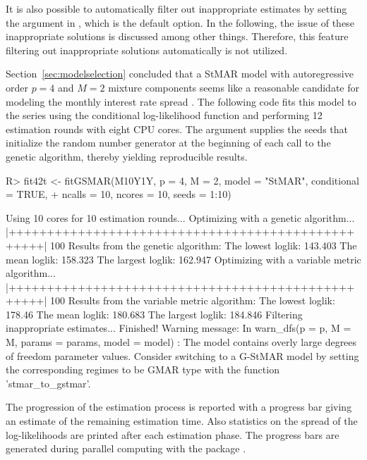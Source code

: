 \documentclass[nojss]{jss} %
\begin{document}
It is also possible to automatically filter out inappropriate estimates by setting the argument  in , which is the default option. In the following, the issue of these inappropriate solutions is discussed among other things. Therefore, this feature filtering out inappropriate solutions automatically is not utilized.

Section~\ref{sec:modelselection} concluded that a StMAR model with autoregressive order $p=4$ and $M=2$ mixture components seems like a reasonable candidate for modeling the monthly interest rate spread . The following code fits this model to the series using the conditional log-likelihood function and performing 12 estimation rounds with eight CPU cores. The argument  supplies the seeds that initialize the random number generator at the beginning of each call to the genetic algorithm, thereby yielding reproducible results.
%
\begin{CodeChunk}
\begin{CodeInput}
R> fit42t <- fitGSMAR(M10Y1Y, p = 4, M = 2, model = "StMAR", conditional = TRUE,
+    ncalls = 10, ncores = 10, seeds = 1:10)
\end{CodeInput}
\begin{CodeOutput}
Using 10 cores for 10 estimation rounds...
Optimizing with a genetic algorithm...
  |++++++++++++++++++++++++++++++++++++++++++++++++++| 100%
Results from the genetic algorithm:
The lowest loglik:  143.403
The mean loglik:    158.323
The largest loglik: 162.947
Optimizing with a variable metric algorithm...
  |++++++++++++++++++++++++++++++++++++++++++++++++++| 100%
Results from the variable metric algorithm:
The lowest loglik:  178.46
The mean loglik:    180.683
The largest loglik: 184.846
Filtering inappropriate estimates...
Finished!
Warning message:
In warn_dfs(p = p, M = M, params = params, model = model) :
  The model contains overly large degrees of freedom parameter values.
  Consider switching to a G-StMAR model by setting the corresponding
  regimes to be GMAR type with the function 'stmar_to_gstmar'.
\end{CodeOutput}
\end{CodeChunk}
%
The progression of the estimation process is reported with a progress bar giving an estimate of the remaining estimation time. Also statistics on the spread of the log-likelihoods are printed after each estimation phase. The progress bars are generated during parallel computing with the package  \citep{Solymos+Zawadzki:2020}.
\end{document}
